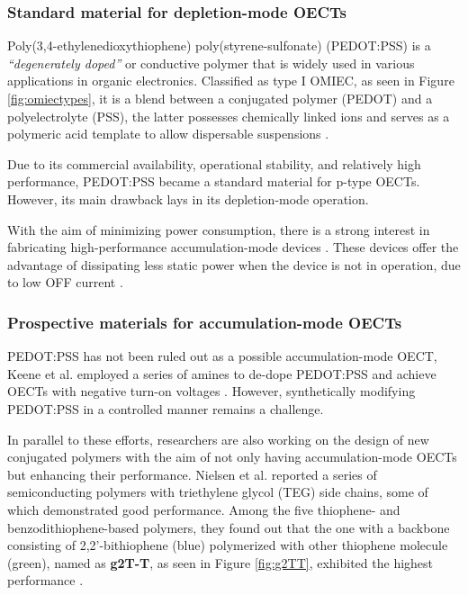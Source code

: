 \subsubsection{Standard material for depletion-mode OECTs}

Poly(3,4-ethylenedioxythiophene) poly(styrene-sulfonate) (PEDOT:PSS) is a \textit{``degenerately doped''} \cite{bernardsSteadyStateTransientBehavior2007} or conductive polymer that is widely used in various applications in organic electronics. Classified as type I OMIEC, as seen in Figure \ref{fig:omiectypes}, it is a blend between a conjugated polymer (PEDOT) and a polyelectrolyte (PSS), the latter possesses chemically linked ions and serves as a polymeric acid template to allow dispersable suspensions \cite{paulsenOrganicMixedIonic2020}.

Due to its commercial availability, operational stability, and relatively high performance, PEDOT:PSS became a standard material for p-type OECTs. However, its main drawback lays in its depletion-mode operation.

With the aim of minimizing power consumption, there is a strong interest in fabricating high-performance accumulation-mode devices \cite{nielsenMolecularDesignSemiconducting2016}\cite{tanOrganicMixedIonic2022}\cite{inalBenchmarkingOrganicMixed2017}\cite{keeneEnhancementModePEDOTPSS2020}. These devices offer the advantage of dissipating less static power when the device is not in operation, due to low OFF current %
\cite{giovannittiEnergeticControlRedoxActive2020}.

\subsubsection{Prospective materials for accumulation-mode OECTs}
PEDOT:PSS has not been ruled out as a possible accumulation-mode OECT, Keene et al. employed a series of amines to de-dope PEDOT:PSS and achieve OECTs with negative turn-on voltages \cite{keeneEnhancementModePEDOTPSS2020}. However, synthetically modifying PEDOT:PSS in a controlled manner remains a challenge. 

In parallel to these efforts, researchers are also working on the design of new conjugated polymers with the aim of not only having accumulation-mode OECTs but enhancing their performance. Nielsen et al. reported a series of semiconducting polymers with triethylene glycol (TEG) side chains, some of which demonstrated good performance. Among the five thiophene- and benzodithiophene-based polymers, they found out that the one with a %
backbone consisting of 2,2'-bithiophene (blue) polymerized with other thiophene molecule (green), named as \textbf{g2T-T}, as seen in Figure \ref{fig:g2TT}, exhibited the highest performance %
\cite{nielsenMolecularDesignSemiconducting2016}.

